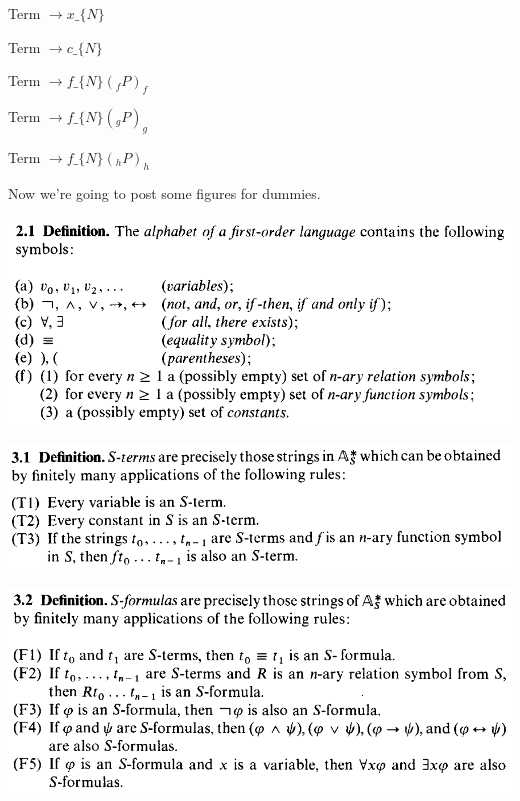 \documentclass[10pt,a4paper]{article}
\begin{document}
		\vspace{3mm}

		Term $\rightarrow x\_\{N\}$

		Term $\rightarrow c\_\{N\}$

		Term $\rightarrow f\_\{N\}(_fP)_f$

		Term $\rightarrow f\_\{N\}(_gP)_g$

		Term $\rightarrow f\_\{N\}(_hP)_h$

		\vspace{120mm}

		Now we're going to post some figures for dummies.

		\begin{center}
		\includegraphics[scale=.5]{21}
		\end{center}

		\begin{center}
		\includegraphics[scale=.5]{31}
		\end{center}

		\begin{center}
		\includegraphics[scale=.5]{32}
		\end{center}
\end{document}
